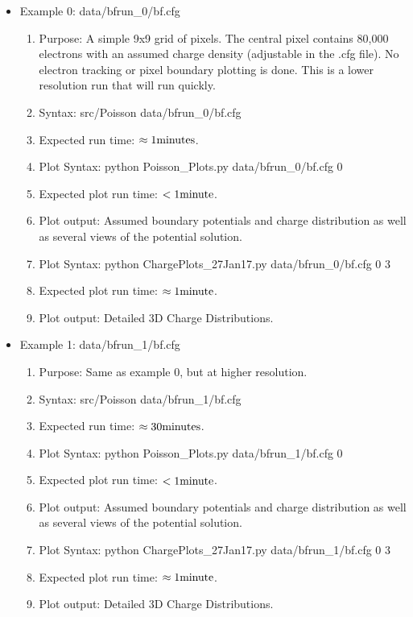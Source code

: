 \documentclass{article} %
\begin{document}
\begin{itemize}
  \item Example 0: data/bfrun\_0/bf.cfg
    \begin{enumerate}
      \item Purpose: A simple 9x9 grid of pixels.  The central pixel contains 80,000 electrons with an assumed charge density (adjustable in the .cfg file).  No electron tracking or pixel boundary plotting is done.  This is a lower resolution run that will run quickly.
      \item Syntax: src/Poisson data/bfrun\_0/bf.cfg
      \item Expected run time: $\rm \approx 1 minutes$.
      \item Plot Syntax: python Poisson\_Plots.py data/bfrun\_0/bf.cfg 0
      \item Expected plot run time: $\rm <1 minute$.
      \item Plot output: Assumed boundary potentials and charge distribution as well as several views of the potential solution. 
      \item Plot Syntax: python ChargePlots\_27Jan17.py data/bfrun\_0/bf.cfg 0 3
      \item Expected plot run time: $\rm \approx 1 minute$.
      \item Plot output: Detailed 3D Charge Distributions.
    \end{enumerate}

  \item Example 1: data/bfrun\_1/bf.cfg
    \begin{enumerate}
      \item Purpose: Same as example 0, but at higher resolution.
      \item Syntax: src/Poisson data/bfrun\_1/bf.cfg
      \item Expected run time: $\rm \approx 30 minutes$.
      \item Plot Syntax: python Poisson\_Plots.py data/bfrun\_1/bf.cfg 0
      \item Expected plot run time: $\rm <1 minute$.
      \item Plot output: Assumed boundary potentials and charge distribution as well as several views of the potential solution. 
      \item Plot Syntax: python ChargePlots\_27Jan17.py data/bfrun\_1/bf.cfg 0 3
      \item Expected plot run time: $\rm \approx 1 minute$.
      \item Plot output: Detailed 3D Charge Distributions.
    \end{enumerate}


\end{itemize}
\end{document}
